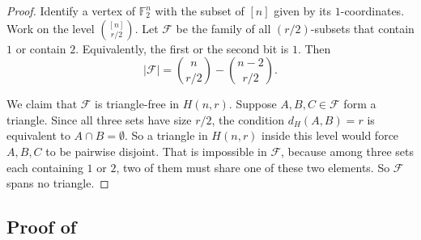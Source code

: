 \documentclass[11pt]{article}
\theoremstyle{plain}
\newcommand{\F}{\mathbb{F}}
\newcommand{\dist}{d_H}
\begin{document}
\begin{proof}
Identify a vertex of $\F_2^n$ with the subset of $[n]$ given by its $1$-coordinates.
Work on the level $\binom{[n]}{r/2}$.
Let $\mathcal{F}$ be the family of all $(r/2)$-subsets that contain $1$ or contain $2$.
Equivalently, the first or the second bit is $1$.
Then
\[
|\mathcal{F}|=\binom{n}{r/2}-\binom{n-2}{r/2}.
\]

We claim that $\mathcal{F}$ is triangle-free in $H(n,r)$.
Suppose $A,B,C\in\mathcal{F}$ form a triangle.
Since all three sets have size $r/2$, the condition $\dist(A,B)=r$ is equivalent to $A\cap B=\emptyset$.
So a triangle in $H(n,r)$ inside this level would force $A,B,C$ to be pairwise disjoint.
That is impossible in $\mathcal{F}$, because among three sets each containing $1$ or $2$, two of them must share one of these two elements.
So $\mathcal{F}$ spans no triangle.
\end{proof}

\subsection{Proof of }
\end{document}
